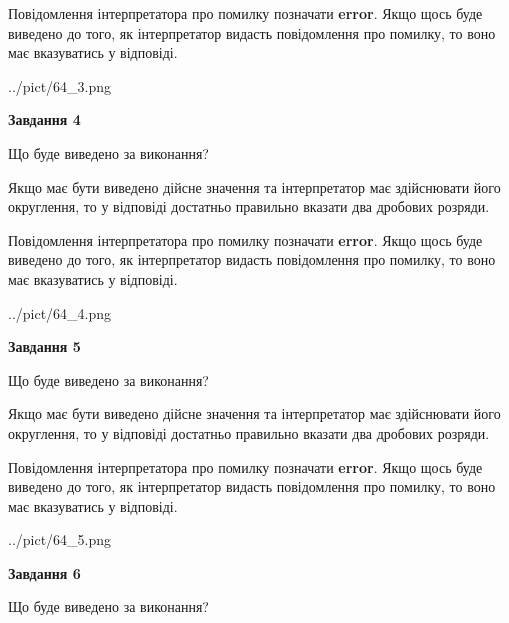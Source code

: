 \documentclass[12pt, ukrainian]{article}
\begin{document}
{\begin {Large}
Повідомлення інтерпретатора про помилку позначати \textbf{error}.
Якщо щось буде виведено до того, як інтерпретатор видасть повідомлення про помилку, 
то воно має вказуватись у відповіді. \par

\begin{center}
	{../pict/64_3.png}
\end{center}
\newpage

{\begin {center}\textbf{Завдання 4}\end {center}}\par
Що буде виведено за виконання? \par

Якщо має бути виведено дійсне значення та інтерпретатор має здійснювати його округлення, 
то у відповіді достатньо правильно вказати два дробових розряди.

Повідомлення інтерпретатора про помилку позначати \textbf{error}.
Якщо щось буде виведено до того, як інтерпретатор видасть повідомлення про помилку, 
то воно має вказуватись у відповіді. \par

\begin{center}
	{../pict/64_4.png}
\end{center}
\newpage

{\begin {center}\textbf{Завдання 5}\end {center}}\par
Що буде виведено за виконання? \par

Якщо має бути виведено дійсне значення та інтерпретатор має здійснювати його округлення, 
то у відповіді достатньо правильно вказати два дробових розряди.

Повідомлення інтерпретатора про помилку позначати \textbf{error}.
Якщо щось буде виведено до того, як інтерпретатор видасть повідомлення про помилку, 
то воно має вказуватись у відповіді. \par

\begin{center}
	{../pict/64_5.png}
\end{center}
\newpage

{\begin {center}\textbf{Завдання 6}\end {center}}\par
Що буде виведено за виконання? \par


\end{Large}}
\end{document}
